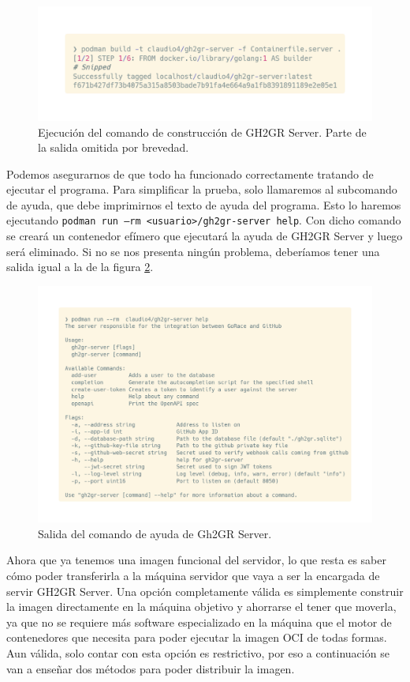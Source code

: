 \begin{figure}[H]
    \centering
    \includegraphics[width=0.75\linewidth]{images/build-server.png}
    \caption{Ejecución del comando de construcción de GH2GR Server. Parte de la salida omitida por brevedad.}
    \label{fig:build-server}
\end{figure}

Podemos asegurarnos de que todo ha funcionado correctamente tratando de ejecutar el programa. Para simplificar la prueba, solo llamaremos al subcomando de ayuda, que debe imprimirnos el texto de ayuda del programa. Esto lo haremos ejecutando \texttt{podman run --rm <usuario>/gh2gr-server help}. Con dicho comando se creará un contenedor efímero que ejecutará la ayuda de GH2GR Server y luego será eliminado. Si no se nos presenta ningún problema, deberíamos tener una salida igual a la de la figura \ref{fig:server-help}.


\begin{figure}
    \centering
    \includegraphics[width=0.75\linewidth]{images/server-help.png}
    \caption{Salida del comando de ayuda de Gh2GR Server.}
    \label{fig:server-help}
\end{figure}

Ahora que ya tenemos una imagen funcional del servidor, lo que resta es saber cómo poder transferirla a la máquina servidor que vaya a ser la encargada de servir GH2GR Server. Una opción completamente válida es simplemente construir la imagen directamente en la máquina objetivo y ahorrarse el tener que moverla, ya que no se requiere más software especializado en la máquina que el motor de contenedores que necesita para poder ejecutar la imagen \acrshort{OCI} de todas formas. Aun válida, solo contar con esta opción es restrictivo, por eso a continuación se van a enseñar dos métodos para poder distribuir la imagen.

